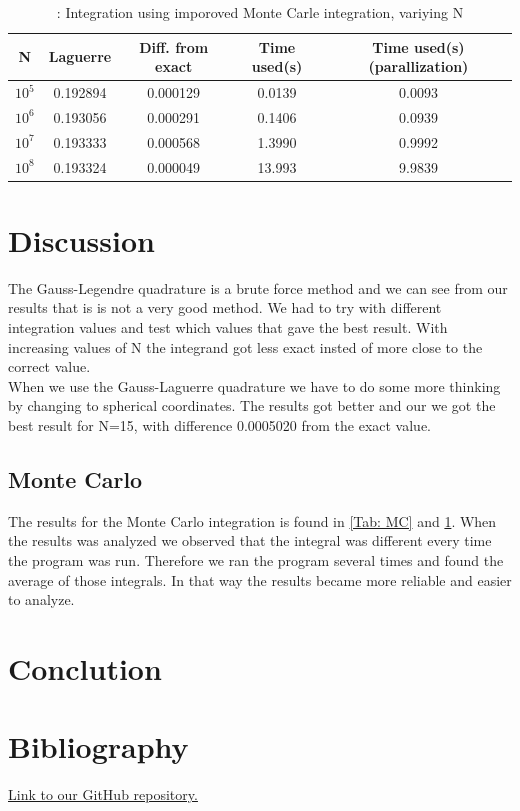 \documentclass{article}
\begin{document}
\begin{table}[h!]
  \caption{: Integration using imporoved Monte Carle integration, variying N}
  \begin{tabular}{c c c c c}
    N & Laguerre & Diff. from exact & Time used(s) & Time used(s) (parallization) \\
    \hline
    $10^5$ & 0.192894 & 0.000129  & 0.0139   & 0.0093 \\
    $10^6$ & 0.193056 & 0.000291  & 0.1406   & 0.0939 \\
    $10^7$ & 0.193333 & 0.000568  & 1.3990   & 0.9992 \\
    $10^8$ & 0.193324 & 0.000049  & 13.993   & 9.9839 \\
  \end{tabular}
  \label{Tab: improvedMC}
\end{table}


\section*{Discussion}
The Gauss-Legendre quadrature is a brute force method and we can see from our results that is is not a very good method. We had to try with different integration values and test which values that gave the best result. With increasing values of N the integrand got less exact insted of more close to the correct value.\\
When we use the Gauss-Laguerre quadrature we have to do some more thinking by changing to spherical coordinates. The results got better and our we got the best result for N=15, with difference 0.0005020 from the exact value.


\subsection*{Monte Carlo}
The results for the Monte Carlo integration is found in \ref{Tab: MC} and \ref{Tab: improvedMC}. When the results was analyzed we observed that the integral was different every time the program was run. Therefore we ran the program several times and found the average of those integrals. In that way the results became more reliable and easier to analyze.



\section*{Conclution}


\section*{Bibliography}
\href{https://github.com/emmernme/MENA-Compfys/tree/master/Project3}{Link to our GitHub repository.}
\end{document}
